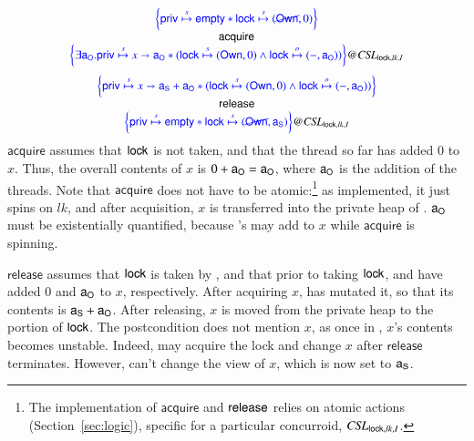 \[
{\small
\begin{array}{c}
\spec{\hpriv \spts \hempty \lsep \hlock \spts (\lockNown, 0)}\\
{\mathsf{acquire}}\\
\spec{\exists \gE. \hpriv \spts x \hpts \gE \lsep (\hlock \spts
  (\lockOwn, 0) \aand \hlock \opts (-, \gE))}{@\CSL_{\hlock,lk,I}}
\end{array}
}\]
\[
{\small
\begin{array}{c}
\spec{\hpriv \spts x \hpts \gL + \gE \lsep (\hlock \spts
  (\lockOwn, 0) \aand \hlock \opts (-, \gE))}\\
{\mathsf{release}}\\
\spec{\hpriv \spts \hempty \lsep \hlock \spts (\lockNown, \gL)}{@\CSL_{\hlock,lk,I}}
\end{array}
}\]
%
$\mathsf{acquire}$ assumes that $\mathsf{lock}$ is not taken, and that the
\self thread so far has added $0$ to $x$. Thus, the overall contents
of $x$ is $0 + \mathsf{a}_{{\mathsf{O}}} = \mathsf{a}_{{\mathsf{O}}}$, where $\mathsf{a}_{{\mathsf{O}}}$ is the addition of the \other
threads. Note that $\mathsf{acquire}$ does not have to be
atomic:\footnote{The implementation of $\mathsf{acquire}$ and
  $\mathsf{release}$ relies on atomic actions (Section~\ref{sec:logic}),
  specific for a particular concurroid, \eg $\textit{CSL}_{\mathsf{lock},lk,I}$.} as
implemented, it just spins on $lk$, and after acquisition, $x$ is
transferred into the private heap of \self.
%
$\mathsf{a}_{{\mathsf{O}}}$ must be existentially quantified, because \other's may
add to $x$ while $\mathsf{acquire}$ is spinning.

$\mathsf{release}$ assumes that $\mathsf{lock}$ is taken by \self, and that
prior to taking $\mathsf{lock}$, \self and \other have added $0$ and $\mathsf{a}_{{\mathsf{O}}}$ to
$x$, respectively. After acquiring $x$, \self has mutated it, so that
its contents is $\mathsf{a}_{{\mathsf{S}}} + \mathsf{a}_{{\mathsf{O}}}$. After releasing, $x$ is moved from the
private heap to the \joint portion of $\mathsf{lock}$. The postcondition
does not mention $x$, as once in \joint, $x$'s contents becomes
unstable. Indeed, \other may acquire the lock and change $x$ after
$\mathsf{release}$ terminates. However, \other can't change the \self
view of $x$, which is now set to $\mathsf{a}_{{\mathsf{S}}}$.

